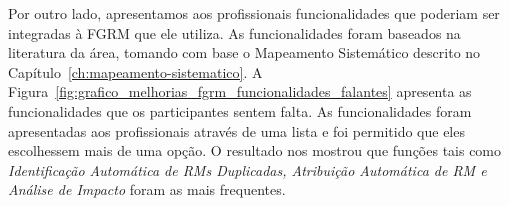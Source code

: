 Por outro lado, apresentamos aos profissionais funcionalidades que poderiam ser
integradas à FGRM que ele utiliza. As funcionalidades foram baseados na
literatura da área, tomando com base o Mapeamento Sistemático descrito no
Capítulo~\ref{ch:mapeamento-sistematico}. A
Figura~\ref{fig:grafico_melhorias_fgrm_funcionalidades_falantes} apresenta as
funcionalidades que os participantes sentem falta. As funcionalidades foram
apresentadas aos profissionais através de uma lista e foi permitido que eles
escolhessem mais de uma opção. O resultado nos mostrou que funções tais como
\textit{Identificação Automática de RMs Duplicadas, Atribuição Automática de RM
    e Análise de Impacto} foram as mais frequentes.



